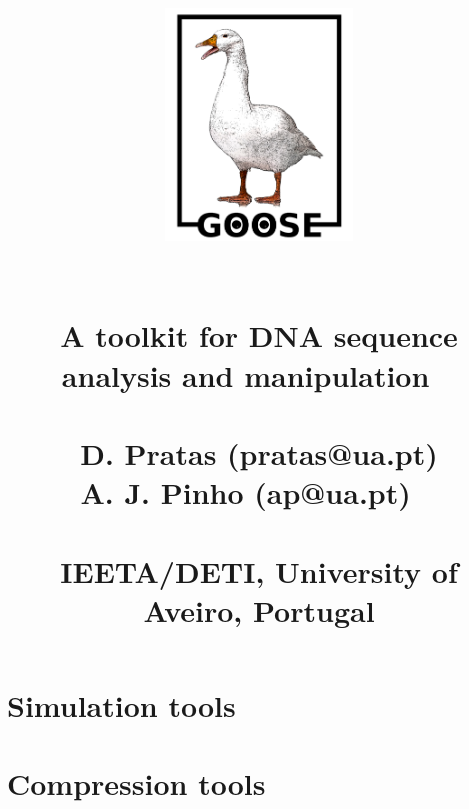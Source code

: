 \documentclass[11pt,journal,compsoc]{report}[1]
\begin{document}

\title{
%
\begin{figure}[h!]
\centerline{\includegraphics[width=5cm]{../imgs/logo.pdf}}
\label{logo}
\end{figure}
~\\
\textbf{A toolkit for DNA sequence\\ analysis and manipulation}
~\\~\\
\large
D. Pratas (pratas@ua.pt)\\
A. J. Pinho (ap@ua.pt)
~\\~\\
\small
IEETA/DETI, University of Aveiro, Portugal\\
}
\date{}
\maketitle

\tableofcontents

\chapter*{Simulation tools}



\chapter*{Compression tools}


\end{document}
